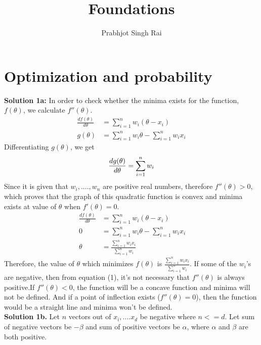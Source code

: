 \documentclass[11pt]{article}
\begin{document}
\title{Foundations}
\author{Prabhjot Singh Rai}
\maketitle

\section{Optimization and probability}

\textbf{Solution 1a:} In order to check whether the minima exists for the function, $f(\theta)$, we calculate $f''(\theta)$.
\begin{equation*}
\begin{split}
\frac{df(\theta)}{d\theta} & = \sum_{i=1}^{n} w_i(\theta - x_i)\\
g(\theta)& = \sum_{i=1}^{n} w_i \theta - \sum_{i=1}^{n} w_i x_i
\end{split}
\end{equation*}
Differentiating $g(\theta)$, we get
\begin{equation}
\frac{dg(\theta)}{d\theta} = \sum_{i=1}^{n} w_i \\
\end{equation}
Since it is given that $w_i, ...., w_n$ are positive real numbers, therefore $f''(\theta) > 0$, which proves that the graph of this quadratic function is convex and minima exists at value of $\theta$ when $f'(\theta) = 0$.
\begin{equation*}\
\begin{split}
\frac{df(\theta)}{d\theta} & =  \sum_{i=1}^{n} w_i(\theta - x_i)\\
0 & = \sum_{i=1}^{n} w_i \theta - \sum_{i=1}^{n} w_i x_i\\
\theta & = \frac{\sum_{i=1}^{n} w_i x_i}{\sum_{i=1}^{n} w_i}
\end{split}
\end{equation*}
Therefore, the value of $\theta$ which minimizes $f(\theta)$ is $ \frac{\sum_{i=1}^{n} w_i x_i}{\sum_{i=1}^{n} w_i}$.
If some of the $w_i$'s are negative, then from equation (1), it's not necessary that $f''(\theta)$ is always positive.If $f''(\theta)<0$, the function will be a concave function and minima will not be defined. And if a point of inflection exists ($f''(\theta) = 0$), then the function would be a straight line and minima won't be defined. \\
\linebreak
\textbf{Solution 1b.} Let $n$ vectors out of $x_i, .... x_d$ be negative where $n <= d$. Let sum of negative vectors be $-\beta$ and sum of positive vectors be $\alpha$, where $\alpha$ and $\beta$ are both positive.
\end{document}
